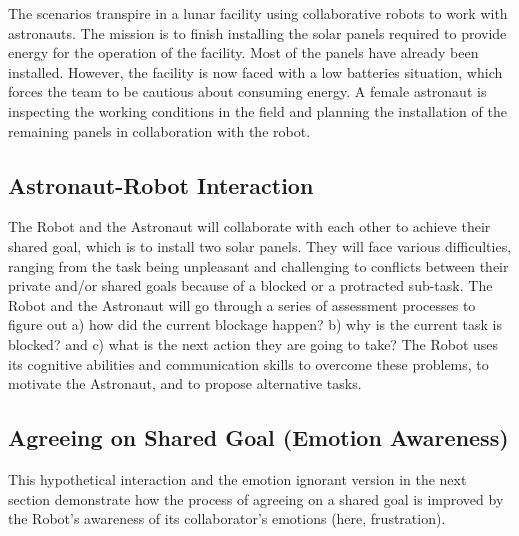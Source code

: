 The scenarios transpire in a lunar facility using collaborative robots to work
with astronauts. The mission is to finish installing the solar panels required
to provide energy for the operation of the facility. Most of the panels have
already been installed. However, the facility is now faced with a low batteries
situation, which forces the team to be cautious about consuming energy. A female
astronaut is inspecting the working conditions in the field and planning the
installation of the remaining panels in collaboration with the robot.

\subsection{Astronaut-Robot Interaction}

The Robot and the Astronaut will collaborate with each other to achieve their
shared goal, which is to install two solar panels. They will face various
difficulties, ranging from the task being unpleasant and challenging to
conflicts between their private and/or shared goals because of a blocked or a
protracted sub-task. The Robot and the Astronaut will go through a series of
assessment processes to figure out a) how did the current blockage happen? b)
why is the current task is blocked? and c) what is the next action they are
going to take? The Robot uses its cognitive abilities and communication skills
to overcome these problems, to motivate the Astronaut, and to propose
alternative tasks.

\subsection{Agreeing on Shared Goal (Emotion Awareness)}
\label{sec:exp1}

This hypothetical interaction and the emotion ignorant version in the next
section demonstrate how the process of agreeing on a shared goal is improved by
the Robot's awareness of its collaborator's emotions (here, frustration).

